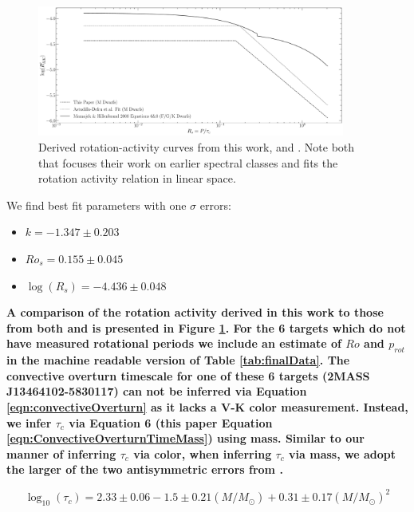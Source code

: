\begin{figure}
    \centering
    \includegraphics[width=0.9\textwidth]{figures/magActivity/RpHKvsR0_MC_fits.pdf}
	\caption{Derived rotation-activity curves from this work, \citet{Def17} and
	\citet{Mamajek2008}. Note both that \citet{Mamajek2008} focuses their work
	on earlier spectral classes and fits the rotation activity relation in
	linear space.}
    \label{fig:RpHKvsRossbyFits}
\end{figure}

We find best fit parameters with one $\sigma$ errors:
\begin{itemize}
    \item $k = -1.347\pm 0.203$
    \item $Ro_{s} =  0.155\pm0.045$
    \item $\log(R_{s}) = -4.436\pm0.048$

\end{itemize}
\textbf{A comparison of the rotation activity derived in this work to those
from both \citet{Def17} and \citet{Mamajek2008} is presented in Figure
\ref{fig:RpHKvsRossbyFits}. For the 6 targets which do not have measured
rotational periods we include an estimate of $Ro$ and $p_{rot}$ in the machine
readable version of Table \ref{tab:finalData}. The convective overturn
timescale for one of these 6 targets (2MASS J13464102-5830117) can not be
inferred via Equation \ref{eqn:convectiveOverturn} as it lacks a V-K color
measurement. Instead, we infer $\tau_{c}$ via \citet{Wri18} Equation 6 (this
paper Equation \ref{eqn:ConvectiveOverturnTimeMass}) using mass. Similar to our
manner of inferring $\tau_{c}$ via color, when inferring $\tau_c$ via mass, we
adopt the larger of the two antisymmetric errors from \citet{Wri18}.}

\begin{equation}\label{eqn:ConvectiveOverturnTimeMass}
	\log_{10}(\tau_{c}) = 2.33\pm0.06 - 1.5\pm0.21\left(M/M_{\odot}\right) + 0.31\pm0.17\left(M/M_{\odot}\right)^{2}
\end{equation}

